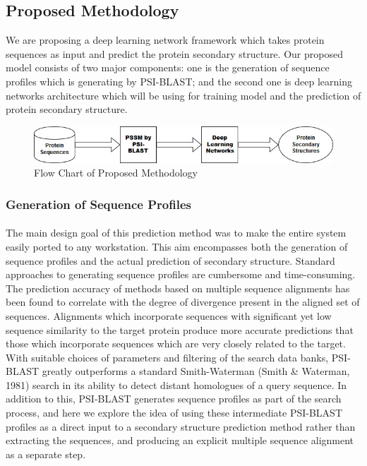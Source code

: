 \documentclass[12pt]{article}
\numberwithin{figure}{section}
\begin{document}
\subsection{Proposed Methodology}
We are proposing a deep learning network framework which takes protein sequences as input and predict the protein secondary structure. Our proposed model consists of two major components: one is the generation of sequence profiles which is generating by PSI-BLAST; and the second one is deep learning networks architecture which will be using for training model and the prediction of protein secondary structure.
\begin{figure}[h]
    \centering
    \includegraphics[width=\textwidth]{Arch.jpg}
    \caption{Flow Chart of Proposed Methodology}
    \label{fig:my_label}
\end{figure}
\subsubsection{Generation of Sequence Profiles}
\paragraph{}
The main design goal of this prediction method was to make the entire system easily ported to any workstation. This aim encompasses both the generation of sequence profiles and the actual prediction of secondary structure. Standard approaches to generating sequence profiles are cumbersome and time-consuming. The prediction accuracy of methods based on multiple sequence alignments has been found to correlate with the degree of divergence present in the aligned set of sequences. Alignments which incorporate sequences with significant yet low sequence similarity to the target protein produce more accurate predictions that those which incorporate sequences which are very closely related to the target. With suitable choices of parameters and filtering of the search data banks, PSI-BLAST greatly outperforms a standard Smith-Waterman \cite{1} (Smith \& Waterman, 1981) search in its ability to detect distant homologues of a query sequence. In addition to this, PSI-BLAST \cite{2} generates sequence profiles as part of the search process, and here we explore the idea of using these intermediate PSI-BLAST profiles as a direct input to a secondary structure prediction method rather than extracting the sequences, and producing an explicit multiple sequence alignment as a separate step.
\end{document}
